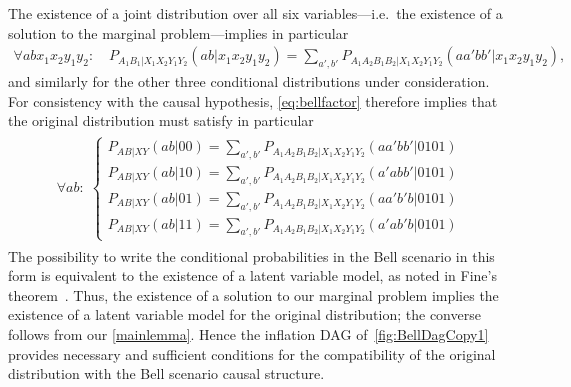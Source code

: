 \documentclass[aps,english,superscriptaddress,onecolumn,twoside,longbibliography,pra,floatfix,fleqn,nofootinbib]{revtex4-1}%
\theoremstyle{definition}
\begin{document}
The existence of a joint distribution over all six variables---i.e.~the existence of a solution to the marginal problem---implies in particular
\begin{align}
	\forall{a b x_1 x_2 y_1 y_2}: \quad P_{A_1 B_1 | X_1 X_2 Y_1 Y_2}(a b | x_1 x_2 y_1 y_2)  =  \sum\nolimits_{a',b'} P_{A_1 A_2 B_1 B_2 | X_1 X_2 Y_1 Y_2}(a a' b b'|x_1 x_2 y_1 y_2),
\end{align}
and similarly for the other three conditional distributions under consideration. For consistency with the causal hypothesis, \cref{eq:bellfactor} therefore implies that the original distribution must satisfy in particular
\begin{align}\begin{split}\label{eq:finalBellstep}\forall{a b}:\; \begin{cases}
	P_{A B | X Y}(a b | 0 0)  =  \sum\nolimits_{a',b'} P_{A_1 A_2 B_1 B_2| X_1 X_2 Y_1 Y_2}(a a' b b'|0101) \\
	P_{A B | X Y}(a b | 1 0)  =  \sum\nolimits_{a',b'} P_{A_1 A_2 B_1 B_2| X_1 X_2 Y_1 Y_2}(a' a b b'|0101) \\
	P_{A B | X Y}(a b | 0 1)  =  \sum\nolimits_{a',b'} P_{A_1 A_2 B_1 B_2| X_1 X_2 Y_1 Y_2}(a a' b' b|0101) \\
	P_{A B | X Y}(a b | 1 1)  =  \sum\nolimits_{a',b'} P_{A_1 A_2 B_1 B_2| X_1 X_2 Y_1 Y_2}(a' a b' b|0101)
\end{cases}\end{split}\end{align}
The possibility to write the conditional probabilities in the Bell scenario in this form is equivalent to the existence of a latent variable model, as noted in Fine's theorem~\cite{FineTheorem}. Thus, the existence of a solution to our marginal problem implies the existence of a latent variable model for the original distribution; the converse follows from our \cref{mainlemma}. Hence the inflation DAG of~\cref{fig:BellDagCopy1} provides necessary and sufficient conditions for the compatibility of the original distribution with the Bell scenario causal structure.
\end{document}
